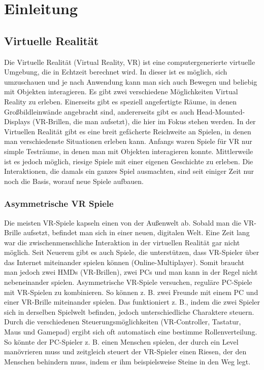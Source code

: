 \chapter{Einleitung}

\section{Virtuelle Realität}
Die Virtuelle Realität (Virtual Reality, VR) ist eine computergenerierte virtuelle Umgebung, die in Echtzeit berechnet wird. In dieser ist es möglich, sich umzuschauen und je nach Anwendung kann man sich auch Bewegen und beliebig mit Objekten interagieren. Es gibt zwei verschiedene Möglichkeiten Virtual Reality zu erleben. Einerseits gibt es speziell angefertigte Räume, in denen Großbildleinwände angebracht sind, andererseits gibt es auch Head-Mounted-Displays (VR-Brillen, die man aufsetzt), die hier im Fokus stehen werden. In der Virtuellen Realität gibt es eine breit gefächerte Reichweite an Spielen, in denen man verschiedenste Situationen erleben kann. Anfangs waren Spiele für VR nur simple Testräume, in denen man mit Objekten interagieren konnte. Mittlerweile ist es jedoch möglich, riesige Spiele mit einer eigenen Geschichte zu erleben. Die Interaktionen, die damals ein ganzes Spiel ausmachten, sind seit einiger Zeit nur noch die Basis, worauf neue Spiele aufbauen.

\subsection{Asymmetrische VR Spiele}
Die meisten VR-Spiele kapseln einen von der Außenwelt ab. Sobald man die VR-Brille aufsetzt, befindet man sich in einer neuen, digitalen Welt. Eine Zeit lang war die zwischenmenschliche Interaktion in der virtuellen Realität gar nicht möglich. Seit Neuerem gibt es auch Spiele, die unterstützen, dass VR-Spieler über das Internet miteinander spielen können (Online-Multiplayer). Somit braucht man jedoch zwei HMDs (VR-Brillen), zwei PCs und man kann in der Regel nicht nebeneinander spielen. Asymmetrische VR-Spiele versuchen, reguläre PC-Spiele mit VR-Spielen zu kombinieren. So können z. B. zwei Freunde mit einem PC und einer VR-Brille miteinander spielen. Das funktioniert z. B., indem die zwei Spieler sich in derselben Spielwelt befinden, jedoch unterschiedliche Charaktere steuern. Durch die verschiedenen Steuerungsmöglichkeiten (VR-Controller, Tastatur, Maus und Gamepad) ergibt sich oft automatisch eine bestimme Rollenverteilung. So könnte der PC-Spieler z. B. einen Menschen spielen, der durch ein Level manövrieren muss und zeitgleich steuert der VR-Spieler einen Riesen, der den Menschen behindern muss, indem er ihm beispielsweise Steine in den Weg legt.

